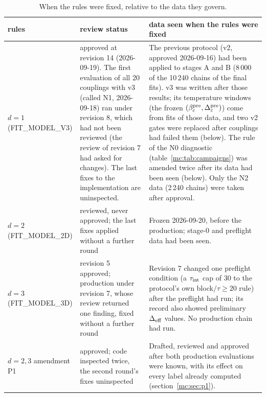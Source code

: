 \begin{table}[htbp]\centering\small
\caption{When the rules were fixed, relative to the data they govern.}\label{mc:tab:timeline}
\begin{tabular}{@{}>{\raggedright\arraybackslash}p{2.9cm}>{\raggedright\arraybackslash}p{5.6cm}>{\raggedright\arraybackslash}p{6.6cm}@{}}\toprule
rules & review status & data seen when the rules were fixed \\\midrule
$d=1$ (FIT\_MODEL\_V3) & approved at revision 14 (2026-09-19). The first evaluation of all 20 couplings with v3 (called N1, 2026-09-18) ran under revision 8, which had not been reviewed (the review of revision 7 had asked for changes). The last fixes to the implementation are uninspected. & The previous protocol (v2, approved 2026-09-16) had been applied to stages A and B (8\,000 of the 10\,240 chains of the final fits). v3 was written after those results; its temperature windows (the frozen $(\beta_c^{\rm pre},\Delta_\varepsilon^{\rm pre})$) come from fits of those data, and two v2 gates were replaced after couplings had failed them (below). The rule of the N0 diagnostic (table~\ref{mc:tab:campaigns}) was amended twice after its data had been seen (below). Only the N2 data (2\,240 chains) were taken after approval. \\
$d=2$ (FIT\_MODEL\_2D) & reviewed, never approved; the last fixes applied without a further round & Frozen 2026-09-20, before the production; stage-0 and preflight data had been seen. \\
$d=3$ (FIT\_MODEL\_3D) & revision 5 approved; production under revision 7, whose review returned one finding, fixed without a further round & Revision 7 changed one preflight condition (a $\tau_{\rm int}$ cap of 30 to the protocol's own block$/\tau\ge20$ rule) after the preflight had run; its record also showed preliminary $\Delta_{\rm eff}$ values. No production chain had run. \\
$d=2,3$ amendment P1 & approved; code inspected twice, the second round's fixes uninspected & Drafted, reviewed and approved after both production evaluations were known, with its effect on every label already computed (section~\ref{mc:sec:p1}). \\\bottomrule
\end{tabular}
\end{table}

